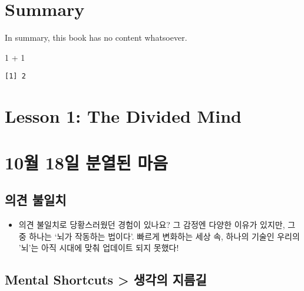 \documentclass[
  letterpaper,
  DIV=11,
  numbers=noendperiod]{scrreprt}
\newenvironment{Shaded}{\begin{snugshade}}{\end{snugshade}}
\newcommand{\DecValTok}[1]{\textcolor[rgb]{0.68,0.00,0.00}{#1}}
\newcommand{\SpecialCharTok}[1]{\textcolor[rgb]{0.37,0.37,0.37}{#1}}
\providecommand{\tightlist}{%
  \setlength{\itemsep}{0pt}\setlength{\parskip}{0pt}}\usepackage{longtable,booktabs,array}
\begin{document}

\hypertarget{summary}{%
\chapter{Summary}\label{summary}}

In summary, this book has no content whatsoever.

\begin{Shaded}
\begin{Highlighting}[]
\DecValTok{1} \SpecialCharTok{+} \DecValTok{1}
\end{Highlighting}
\end{Shaded}

\begin{verbatim}
[1] 2
\end{verbatim}


\hypertarget{lesson-1-the-divided-mind}{%
\chapter{Lesson 1: The Divided Mind}\label{lesson-1-the-divided-mind}}


\hypertarget{uxc6d4-18uxc77c-uxbd84uxc5f4uxb41c-uxb9c8uxc74c}{%
\chapter{10월 18일 분열된
마음}\label{uxc6d4-18uxc77c-uxbd84uxc5f4uxb41c-uxb9c8uxc74c}}

\hypertarget{uxc758uxacac-uxbd88uxc77cuxce58}{%
\section{의견 불일치}\label{uxc758uxacac-uxbd88uxc77cuxce58}}

\begin{itemize}
\tightlist
\item
  의견 불일치로 당황스러웠던 경험이 있나요? 그 감정엔 다양한 이유가
  있지만, 그 중 하나는 `뇌가 작동하는 법이다'. 빠르게 변화하는 세상 속,
  하나의 기술인 우리의 '뇌'는 아직 시대에 맞춰 업데이트 되지 못했다!
\end{itemize}

\hypertarget{mental-shortcuts-uxc0dduxac01uxc758-uxc9c0uxb984uxae38}{%
\section{Mental Shortcuts \textgreater{} 생각의
지름길}\label{mental-shortcuts-uxc0dduxac01uxc758-uxc9c0uxb984uxae38}}
\end{document}

